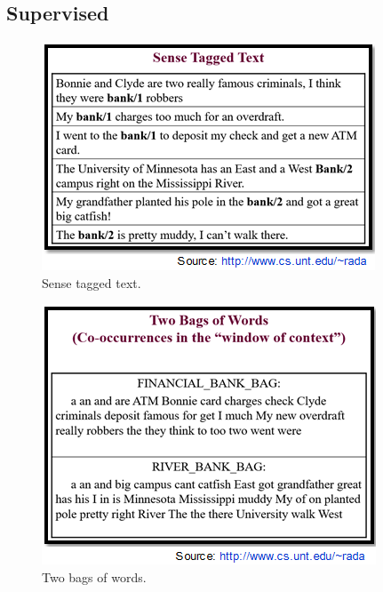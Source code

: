 \subsection*{Supervised}
\begin{figure}[tbh]
	\begin{center}
		\includegraphics[width=\columnwidth]{union(sup1)}
	\end{center}
	\caption{Sense tagged text.}
\end{figure}
\begin{figure}[tbh]
	\begin{center}
		\includegraphics[width=\columnwidth]{union(sup2)}
	\end{center}
	\caption{Two bags of words.}
\end{figure}
